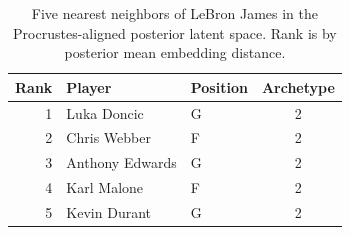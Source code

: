 \begin{table}[htbp]
  \centering\small
  \begin{tabular}{rllc}
    \toprule
    Rank & Player & Position & Archetype \\
    \midrule
    1 & Luka Doncic & G & 2 \\
    2 & Chris Webber & F & 2 \\
    3 & Anthony Edwards & G & 2 \\
    4 & Karl Malone & F & 2 \\
    5 & Kevin Durant & G & 2 \\
    \bottomrule
  \end{tabular}
  \caption{Five nearest neighbors of LeBron James in the Procrustes-aligned posterior latent space. Rank is by posterior mean embedding distance.}
  \label{tab:LeBron_James_neighbors}
\end{table}

